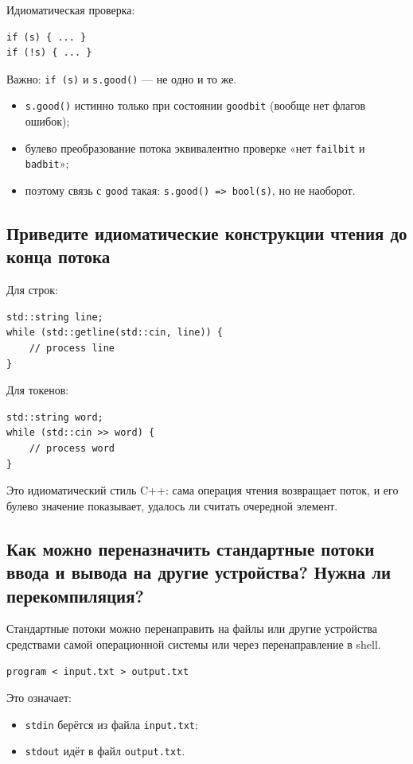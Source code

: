 Идиоматическая проверка:
\begin{verbatim}
if (s) { ... }
if (!s) { ... }
\end{verbatim}

Важно: \texttt{if (s)} и \texttt{s.good()} — не одно и то же.
\begin{itemize}
    \item \texttt{s.good()} истинно только при состоянии \texttt{goodbit} (вообще нет флагов ошибок);
    \item булево преобразование потока эквивалентно проверке «нет \texttt{failbit} и \texttt{badbit}»;
    \item поэтому связь с \texttt{good} такая: \texttt{s.good() => bool(s)}, но не наоборот.
\end{itemize}

\subsection{Приведите идиоматические конструкции чтения до конца потока}
Для строк:
\begin{verbatim}
std::string line;
while (std::getline(std::cin, line)) {
    // process line
}
\end{verbatim}

Для токенов:
\begin{verbatim}
std::string word;
while (std::cin >> word) {
    // process word
}
\end{verbatim}

\begin{remark}
Это идиоматический стиль C++: сама операция чтения возвращает поток, и его булево значение показывает, удалось ли считать очередной элемент.
\end{remark}

\subsection{Как можно переназначить стандартные потоки ввода и вывода на другие устройства? Нужна ли перекомпиляция?}
Стандартные потоки можно перенаправить на файлы или другие устройства средствами самой операционной системы или через перенаправление в shell.

\begin{example}
\begin{verbatim}
program < input.txt > output.txt
\end{verbatim}
\end{example}

Это означает:
\begin{itemize}
    \item \texttt{stdin} берётся из файла \texttt{input.txt};
    \item \texttt{stdout} идёт в файл \texttt{output.txt}.
\end{itemize}

